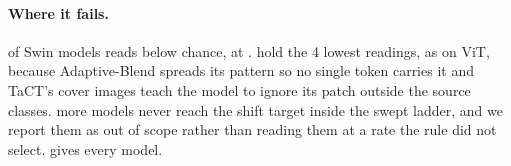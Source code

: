 \paragraph{Where it fails.}
\SwinRecommendedBelowChance{} of \SwinRecommendedN{} Swin models reads below chance, \SwinRecommendedFloorCell{} at \SwinRecommendedFloor{}. \SwinHardestAttacks{} hold the 4 lowest readings, as on ViT, because Adaptive-Blend spreads its pattern so no single token carries it and TaCT's cover images teach the model to ignore its patch outside the source classes. \SwinShiftTargetUnreached{} more models never reach the \AdaptiveShiftTarget{} shift target inside the swept ladder, and we report them as out of scope rather than reading them at a rate the rule did not select.  gives every model.
